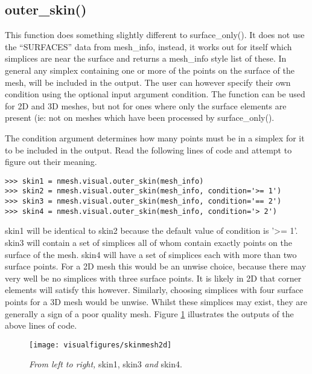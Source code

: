 \subsection{{\ttfamily outer\_skin()}}
This function does something slightly different to {\ttfamily surface\_only()}. It does not use the {\ttfamily ``SURFACES''} data from {\ttfamily mesh\_info}, instead, it works out for itself which simplices are near the surface and returns a {\ttfamily mesh\_info} style list of these. In general any simplex containing one or more of the points on the surface of the mesh, will be included in the output. The user can however specify their own condition using the optional input argument {\ttfamily condition}. The function can be used for 2D and 3D meshes, but not for ones where only the surface elements are present (ie: not on meshes which have been processed by {\ttfamily surface\_only()}.

The {\ttfamily condition} argument determines how many points must be in a simplex for it to be included in the output. Read the following lines of code and attempt to figure out their meaning.
\begin{lstlisting}[basicstyle=\small\ttfamily]
>>> skin1 = nmesh.visual.outer_skin(mesh_info)
>>> skin2 = nmesh.visual.outer_skin(mesh_info, condition='>= 1')
>>> skin3 = nmesh.visual.outer_skin(mesh_info, condition='== 2')
>>> skin4 = nmesh.visual.outer_skin(mesh_info, condition='> 2')
\end{lstlisting}

{\ttfamily skin1} will be identical to {\ttfamily skin2} because the default value of {\ttfamily condition} is {\ttfamily '>= 1'}. {\ttfamily skin3} will contain a set of simplices all of whom contain exactly points on the surface of the mesh. {\ttfamily skin4} will have a set of simplices each with more than two surface points. For a 2D mesh this would be an unwise choice, because there may very well be no simplices with three surface points. It is likely in 2D that corner elements will satisfy this however. Similarly, choosing simplices with four surface points for a 3D mesh would be unwise. Whilst these simplices may exist, they are generally a sign of a poor quality mesh. Figure \ref{fig:skinmesh2d} illustrates the outputs of the above lines of code. 

\begin{figure}
\begin{center}
\texttt{[image: visualfigures/skinmesh2d]}
\caption{{\em From left to right,} {\ttfamily skin1}, {\ttfamily skin3} {\em and} {\ttfamily skin4}. \label{fig:skinmesh2d}}
\end{center}
\end{figure}



